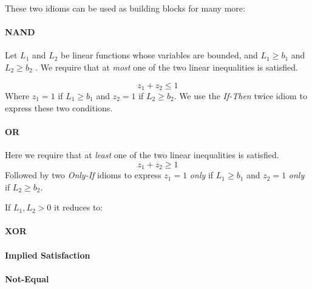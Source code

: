 These two idioms can be used as building blocks for many more:

\paragraph{NAND \\} 

Let $L_1$ and $L_2$ be linear functions whose variables are bounded, and $L_1 \geq b_1$ and $L_2 \geq b_2$ . We require that
at \textit{most} one of the two linear inequalities is satisfied.

$$z_1 + z_2 \leq 1 $$
Where $z_1 = 1$ if $L_1 \geq b_1$ and $z_2 = 1$ if $L_2 \geq b_2$. We use the \textit{If-Then} twice idiom to express these two conditions.

\paragraph{OR \\}
Here we require that at \textit{least} one of the two linear inequalities is satisfied.
$$z_1 + z_2 \geq 1 $$
Followed by two \textit{Only-If} idioms to express $z_1 = 1$ \textit{only} if $L_1 \geq b_1$ and $z_2 = 1$ \textit{only} if $L_2 \geq b_2$.

If $L_1, L_2 > 0$ it reduces to:
$$ $$
$$ $$

\paragraph{XOR \\}

\paragraph{Implied Satisfaction \\}

\paragraph{Not-Equal}